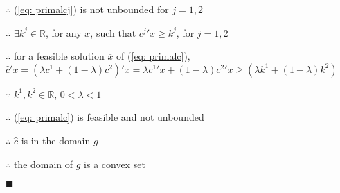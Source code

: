 $\therefore$ (\ref{eq: primalcj}) is not unbounded for $j=1,2$

$\therefore$ $\exists k^j\in{}\mathbb{R}$, for any $x$, such that ${c^j}'x\geq{}k^j$, for $j=1,2$

$\therefore$ for a feasible solution $\overline{x}$ of (\ref{eq: primalc}), $\widehat{c}'\overline{x}=(\lambda{}c^1+(1-\lambda)c^2)'\overline{x}=\lambda{}{c^1}'\overline{x}
+(1-\lambda){c^2}'\overline{x}\geq{}(\lambda{}k^1+(1-\lambda)k^2)$

$\because$ $k^1,k^2\in{}\mathbb{R}$, $0<\lambda<1$

$\therefore$ (\ref{eq: primalc}) is feasible and not unbounded

$\therefore$ $\widehat{c}$ is in the domain $g$

$\therefore$ the domain of $g$ is a convex set
\begin{flushright} $\blacksquare$ \end{flushright}
